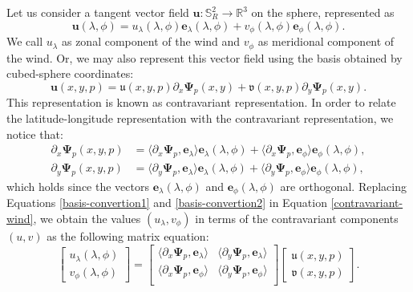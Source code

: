 Let us consider a tangent vector field $\boldsymbol{u}: \mathbb{S}^2_R \to 
\mathbb{R}^3$ on the sphere, represented as
\begin{equation}
	\label{latlon-wind}
	\boldsymbol{u}(\lambda, \phi) = 
	u_{\lambda} (\lambda, \phi) \boldsymbol{e}_{\lambda} (\lambda, \phi) + 
	v_{\phi} (\lambda, \phi) \boldsymbol{e}_{\phi} (\lambda, \phi). 
\end{equation}
We call $u_{\lambda}$ as zonal component of the wind and $v_{\phi}$ as meridional component of the wind.
Or, we may also represent this vector field using the basis 
obtained by cubed-sphere coordinates:
\begin{equation}
	\label{contravariant-wind}
	\boldsymbol{u}(x, y, p) = 
	\mathfrak{u}(x, y, p) \partial_x\boldsymbol{\Psi}_p(x, y) + 
	\mathfrak{v}(x, y, p) \partial_y\boldsymbol{\Psi}_p(x, y).
\end{equation}
This representation is known as contravariant representation.
In order to relate the latitude-longitude representation
with the contravariant representation, we notice that:
\begin{align}
	\label{basis-convertion1}
	\partial_x\boldsymbol{\Psi}_p(x, y, p) &= 
	\langle \partial_x\boldsymbol{\Psi}_p , \boldsymbol{e}_{\lambda}\rangle
	\boldsymbol{e}_{\lambda} (\lambda, \phi)  
	+ \langle 	\partial_x\boldsymbol{\Psi}_p , \boldsymbol{e}_{\phi}\rangle
	\boldsymbol{e}_{\phi} (\lambda, \phi), \\
	\label{basis-convertion2}
	\partial_y\boldsymbol{\Psi}_p(x, y, p) &=  
	\langle \partial_y\boldsymbol{\Psi}_p , \boldsymbol{e}_{\lambda}\rangle
	\boldsymbol{e}_{\lambda} (\lambda, \phi) 
	+ \langle \partial_y\boldsymbol{\Psi}_p , \boldsymbol{e}_{\phi}\rangle
	\boldsymbol{e}_{\phi} (\lambda, \phi), 
\end{align}
which holds since the vectors $\boldsymbol{e}_{\lambda}(\lambda, \phi)$ and
$\boldsymbol{e}_{\phi}(\lambda, \phi)$ are orthogonal.
Replacing Equations \eqref{basis-convertion1} and \eqref{basis-convertion2}
in Equation \eqref{contravariant-wind}, we obtain the values $(u_\lambda, v_\phi)$
in terms of the contravariant components $({u},{v})$ 
as the following matrix equation:
\begin{equation}
	\label{ll-to-contravariant}
	\begin{bmatrix}
		u_\lambda (\lambda, \phi) \\
		v_\phi (\lambda, \phi) 
	\end{bmatrix}
	=
	\begin{bmatrix}
		\langle 	\partial_x\boldsymbol{\Psi}_p, \boldsymbol{e}_\lambda \rangle 
		& \langle 	\partial_y\boldsymbol{\Psi}_p, \boldsymbol{e}_\lambda \rangle \\
		\langle 	\partial_x\boldsymbol{\Psi}_p, \boldsymbol{e}_\phi \rangle 
		& \langle 	\partial_y\boldsymbol{\Psi}_p, \boldsymbol{e}_\phi \rangle \\
	\end{bmatrix}
	\begin{bmatrix}
		\mathfrak{u}(x,y,p) \\
		\mathfrak{v}(x,y,p)
	\end{bmatrix}.
\end{equation}
